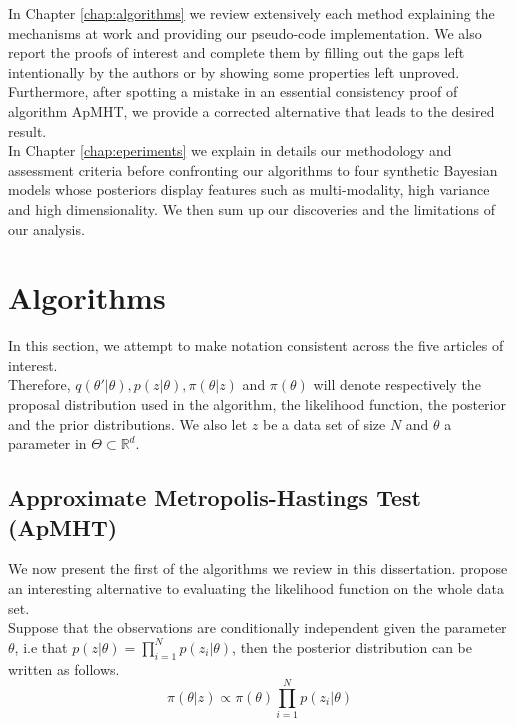 \documentclass[11pt,a4paper]{report}\usepackage[]{graphicx}\usepackage[]{color}
\begin{document}
In Chapter \ref{chap:algorithms} we review extensively each method explaining the mechanisms at work and providing our pseudo-code implementation. We also report the proofs of interest and complete them by filling out the gaps left intentionally by the authors or by showing some properties left unproved. Furthermore, after spotting a mistake in an essential consistency proof of algorithm ApMHT, we provide a corrected alternative that leads to the desired result.\\
In Chapter \ref{chap:eperiments} we explain in details our methodology and assessment criteria before confronting our algorithms to four synthetic Bayesian models whose posteriors display features such as multi-modality, high variance and high dimensionality. We then sum up our discoveries and the limitations of our analysis.
\newpage
\chapter{Algorithms}
In this section, we attempt to make notation consistent across the five articles of interest.\\
Therefore, $q(\theta'|\theta), p(z|\theta),\pi(\theta|z)$ and $\pi(\theta)$ will denote respectively the proposal distribution used in the algorithm, the likelihood function, the posterior and the prior distributions. We also let $z$ be a data set of size $N$ and $\theta$ a parameter in $\Theta\subset\mathbb R^d$.
\label{chap:algorithms}
\section{Approximate Metropolis-Hastings Test (ApMHT)}
\label{sec:korattikara_exp}
We now present the first of the algorithms we review in this dissertation.
\cite{korattikara2014austerity} propose an interesting alternative to evaluating the likelihood function on the whole data set.\\
Suppose that the observations are conditionally independent given the parameter $\theta$, i.e that $p(z|\theta)=\prod_{i=1}^Np(z_i|\theta)$, then the posterior distribution can be written as follows.
$$\pi(\theta|z)\propto\pi(\theta)\prod_{i=1}^Np(z_i|\theta)$$
\end{document}
